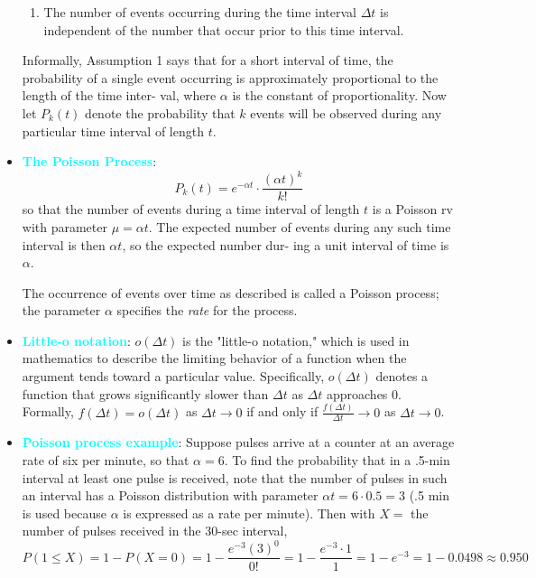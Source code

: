\documentclass{report}
\begin{document}
\begin{itemize}
\begin{enumerate}
            \item The number of events occurring during the time interval $\Delta t$ is independent of the number that occur prior to this time interval.
        \end{enumerate}
        Informally, Assumption 1 says that for a short interval of time, the probability of a
        single event occurring is approximately proportional to the length of the time inter-
        val, where $\alpha$ is the constant of proportionality. Now let $P_k(t)$ denote the probability
        that $k$ events will be observed during any particular time interval of length $t$.
    \item \textbf{\textcolor{cyan}{The Poisson Process}}:
        \[ P_k(t) = e^{-\alpha t} \cdot \frac{(\alpha t)^k}{k!} \]
        so that the number of events during a time interval of length $t$ is a Poisson rv with parameter
        $\mu = \alpha t$. The expected number of events during any such time interval is then $\alpha t$, so the expected number dur-
        ing a unit interval of time is $\alpha$.

        The occurrence of events over time as described is called a Poisson process; the parameter $\alpha$ specifies the \textit{rate} for the process.
    \item \textbf{\textcolor{cyan}{Little-o notation}}:
        \(o(\Delta t)\) is the "little-o notation," which is used in mathematics to describe the limiting behavior of a function when the argument tends toward a particular value. Specifically, \(o(\Delta t)\) denotes a function that grows significantly slower than \(\Delta t\) as \(\Delta t\) approaches 0.
        \bigbreak \noindent 
        Formally,
        \(f(\Delta t) = o(\Delta t)\) as \(\Delta t \to 0\) if and only if \(\frac{f(\Delta t)}{\Delta t} \to 0\) as \(\Delta t \to 0\).
    \item \textbf{\textcolor{cyan}{Poisson process example}}:
        \bigbreak \noindent 
        Suppose pulses arrive at a counter at an average rate of six per minute, so that \(\alpha = 6\).
        To find the probability that in a .5-min interval at least one pulse is received, note that
        the number of pulses in such an interval has a Poisson distribution with parameter
        \(\alpha t = 6 \cdot 0.5 = 3\) (.5 min is used because \(\alpha\) is expressed as a rate per minute). Then with
        \(X =\) the number of pulses received in the 30-sec interval,
        \bigbreak \noindent 
        \[
            P(1 \leq X) = 1 - P(X = 0) = 1 - \frac{e^{-3} (3)^0}{0!} = 1 - \frac{e^{-3} \cdot 1}{1} = 1 - e^{-3} = 1 - 0.0498 \approx 0.950
        \]


    \end{itemize}
\end{document}
